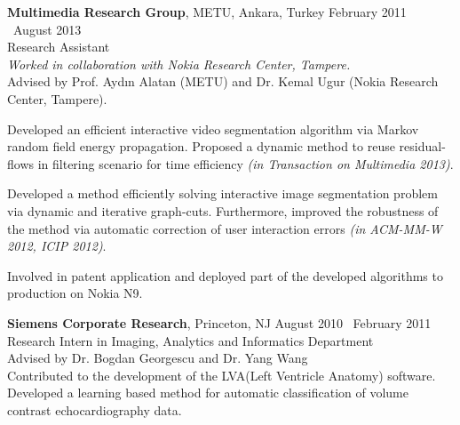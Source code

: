     \textbf{Multimedia Research Group}, METU, Ankara, Turkey \hfill February 2011 \textendash ~August 2013\vspace{0mm}\\\vspace{0mm}
	\hspace{-1mm}Research Assistant  \hfill \vspace{2mm}\\\vspace{0mm}
	\hspace{-1mm}\emph{Worked in collaboration with Nokia Research Center, Tampere.} \\
	Advised by Prof. Ayd\i n Alatan (METU) and Dr. Kemal Ugur (Nokia Research Center, Tampere).

	Developed an efficient interactive video segmentation algorithm via Markov random field energy propagation. Proposed a dynamic method to reuse residual-flows in filtering scenario for time efficiency \emph{(in Transaction on Multimedia 2013)}.

	Developed a method efficiently solving interactive image segmentation problem via dynamic and iterative graph-cuts. Furthermore, improved the robustness of the method via automatic correction of user interaction errors \emph{(in ACM-MM-W 2012, ICIP 2012)}.
	
	Involved in patent application and deployed part of the developed algorithms to production on Nokia N9.

    \textbf{Siemens Corporate Research}, Princeton, NJ \hfill August 2010 \textendash ~February 2011\vspace{0mm}\\\vspace{0mm}
	\hspace{-1mm}Research Intern in Imaging, Analytics and Informatics Department  \hfill \vspace{0mm}\\\vspace{0mm}
	\hspace{-1mm}Advised by Dr. Bogdan Georgescu and Dr. Yang Wang \hfill \vspace{2mm}\\\vspace{0mm}
	\hspace{-1.4mm}Contributed to the development of the LVA(Left Ventricle Anatomy) software. Developed a learning based method for automatic classification of volume contrast echocardiography data.
